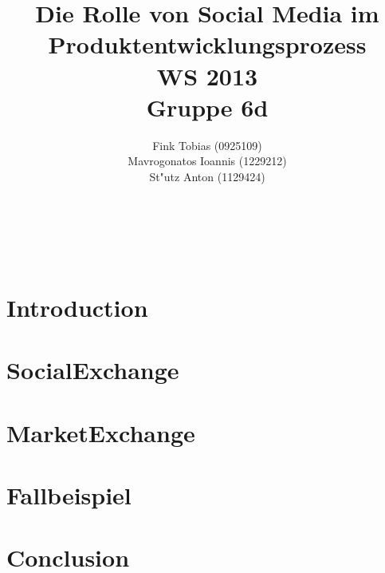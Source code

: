 \documentclass[a4paper, 12pt]{article} %
\title{\textbf{Die Rolle von Social Media im Produktentwicklungsprozess
}\\ %
WS 2013\\\vspace{5pt}
Gruppe 6d} %
\author{Fink Tobias (0925109)\\
 Mavrogonatos Ioannis (1229212)\\
 St"utz Anton (1129424)\\
 \vspace{10pt}
\textbf{}
\\{\textit{}}} %
\makeatletter
\renewcommand{\maketitle}{ %
\begin{flushright} %
{\LARGE\@title} %

\vspace{50pt} %

{\large\@author} %
\\ \vspace{10pt}\@date %

\vspace{40pt} %
\end{flushright}
}
\makeatother
\begin{document}
\maketitle %

\newpage

\tableofcontents

\newpage



\section{Introduction}


\section{SocialExchange}


\section{MarketExchange}


\section{Fallbeispiel}


\section{Conclusion}






\end{document}
